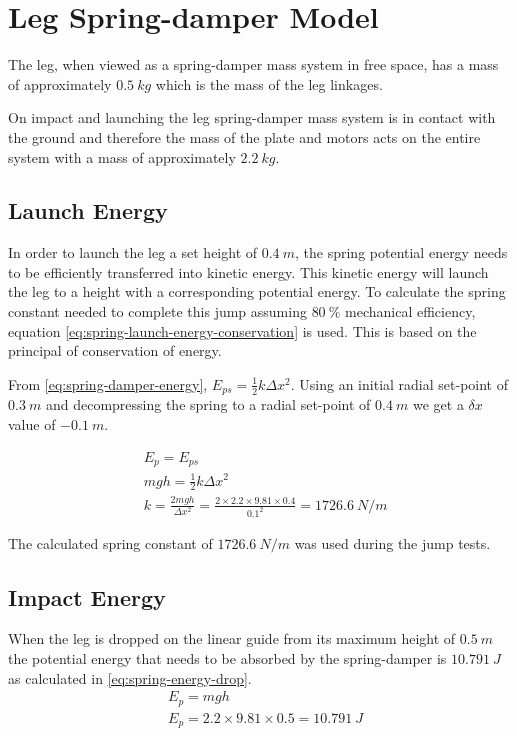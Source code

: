 \section{Leg Spring-damper Model}
\label{sec:Leg Spring-damper Model}
The leg, when viewed as a spring-damper mass system in free space, has a mass of approximately $0.5\ kg$ which is the mass of the leg linkages.

On impact and launching the leg spring-damper mass system is in contact with the ground and therefore the mass of the plate and motors acts on the entire system with a mass of approximately $2.2\ kg$.

\subsection{Launch Energy}
In order to launch the leg a set height of $0.4\ m$, the spring potential energy needs to be efficiently transferred into kinetic energy. This kinetic energy will launch the leg to a height with a corresponding potential energy. To calculate the spring constant needed to complete this jump assuming $80\ \%$ mechanical efficiency, equation \cref{eq:spring-launch-energy-conservation} is used. This is based on the principal of conservation of energy.

From \cref{eq:spring-damper-energy}, $E_{ps} = \frac{1}{2}k\Delta x^2$. Using an initial radial set-point of $0.3\ m$ and decompressing the spring to a radial set-point of $0.4\ m$ we get a $\delta x$ value of $-0.1\ m$.

\begin{equation} \label{eq:spring-launch-energy-conservation}
\begin{aligned}
&E_p = E_{ps} \\
&mgh = \frac{1}{2}k \Delta x^2 \\
&k = \frac{2mgh}{\Delta x^2} = \frac{2\times 2.2 \times 9.81 \times 0.4}{0.1^2} = 1726.6\ N/m
\end{aligned}
\end{equation}

The calculated spring constant of $1726.6\ N/m$ was used during the jump tests.

\subsection{Impact Energy}
When the leg is dropped on the linear guide from its maximum height of $0.5\ m$ the potential energy that needs to be absorbed by the spring-damper is $10.791\ J$ as calculated in \cref{eq:spring-energy-drop}.
\begin{equation} \label{eq:spring-energy-drop}
\begin{aligned}
&E_p = mgh \\
&E_p = 2.2\times 9.81 \times 0.5 = 10.791\ J
\end{aligned}
\end{equation}

